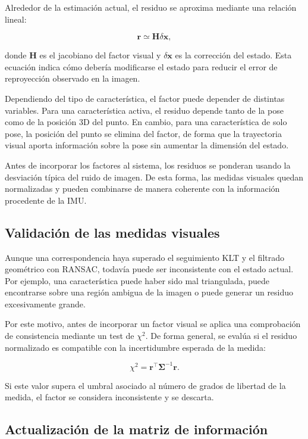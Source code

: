 Alrededor de la estimación actual, el residuo se aproxima mediante una relación lineal:

\[
\mathbf{r}
\simeq
\mathbf{H}\delta\mathbf{x},
\]

donde $\mathbf{H}$ es el jacobiano del factor visual y $\delta\mathbf{x}$ es la corrección
del estado. Esta ecuación indica cómo debería modificarse el estado para reducir el error
de reproyección observado en la imagen.

Dependiendo del tipo de característica, el factor puede depender de distintas variables.
Para una característica activa, el residuo depende tanto de la pose como de la posición 3D
del punto. En cambio, para una característica de solo pose, la posición del punto se
elimina del factor, de forma que la trayectoria visual aporta información sobre la pose sin
aumentar la dimensión del estado.

Antes de incorporar los factores al sistema, los residuos se ponderan usando la desviación
típica del ruido de imagen. De esta forma, las medidas visuales quedan normalizadas y
pueden combinarse de manera coherente con la información procedente de la IMU.

\subsection{Validación de las medidas visuales}

Aunque una correspondencia haya superado el seguimiento KLT y el filtrado geométrico con
RANSAC, todavía puede ser inconsistente con el estado actual. Por ejemplo, una característica puede
haber sido mal triangulada, puede encontrarse sobre una región ambigua de la imagen o puede
generar un residuo excesivamente grande.

Por este motivo, antes de incorporar un factor visual se aplica una comprobación de
consistencia mediante un test de $\chi^2$. De forma general, se evalúa si el residuo
normalizado es compatible con la incertidumbre esperada de la medida:

\[
\chi^2 =
\mathbf{r}^\top
\mathbf{\Sigma}^{-1}
\mathbf{r}.
\]

Si este valor supera el umbral asociado al número de grados de libertad de la medida, el
factor se considera inconsistente y se descarta.

\subsection{Actualización de la matriz de información}

